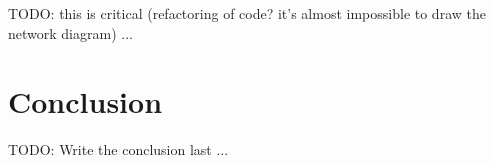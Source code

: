 \documentclass[a4paper,12pt]{article}
\begin{document}
TODO: this is critical (refactoring of code? it's almost impossible to draw
the network diagram) ...

\section{Conclusion}
\label{conclusion}

TODO: Write the conclusion last ...




\end{document}
